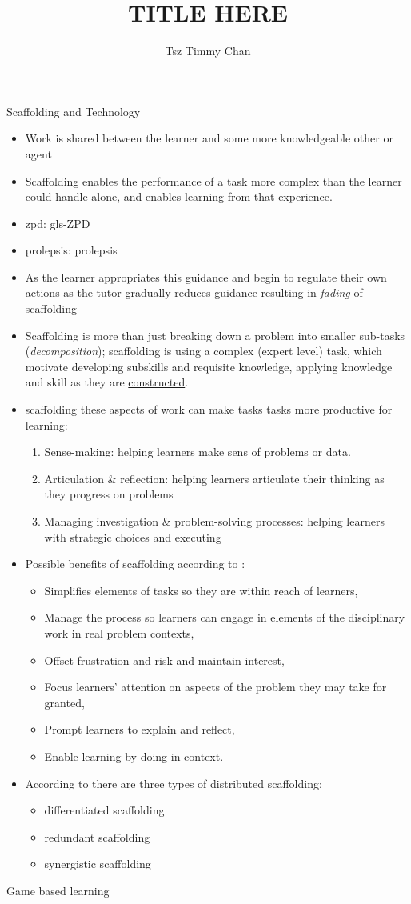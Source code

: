 \documentclass{TC}
\title{TITLE HERE}	%
\author{Tsz Timmy Chan}	%
\begin{document}
Scaffolding \parencite{reiser_scaffolding_2014, tabak_research_2018} and Technology \parencite{scardamalia_knowledge_2014}
\begin{itemize}
\item Work is shared between the learner and some more knowledgeable other or agent
\item Scaffolding enables the performance of a task more complex than the learner could handle alone, and enables learning from that experience.
\item \gls{zpd}: \glsdesc{gls-ZPD}
\item \gls{prolepsis}: \glsdesc{prolepsis}
\item As the learner appropriates this guidance and begin to regulate their own actions as the tutor gradually reduces guidance resulting in \emph{fading} of scaffolding
\item Scaffolding is more than just breaking down a problem into smaller sub-tasks (\textit{decomposition}); scaffolding is using a complex (expert level) task, which motivate developing subskills and requisite knowledge, applying knowledge and skill as they are \underline{constructed}.
\item scaffolding these aspects of work can make tasks tasks more productive for learning:
	\begin{enumerate}
	\item Sense-making: helping learners make sens of problems or data.
	\item Articulation \& reflection: helping learners articulate their thinking as they progress on problems
	\item Managing investigation \& problem-solving processes: helping learners with strategic choices and executing 
	\end{enumerate}
\item Possible benefits of scaffolding according to \parencite{reiser_scaffolding_2014}:
	\begin{itemize}
	\item Simplifies elements of tasks so they are within reach of learners,
	\item Manage the process so learners can engage in elements of the disciplinary work in real problem contexts,
	\item Offset frustration and risk and maintain interest,
	\item Focus learners' attention on aspects of the problem they may take for granted,
	\item Prompt learners to explain and reflect,
	\item Enable learning by doing in context.
	\end{itemize}
\item According to there are three types of \gls{distributed scaffolding}: 
	\begin{itemize}
	\item \Gls{differentiated scaffolding}
	\item \Gls{redundant scaffolding}
	\item \Gls{synergistic scaffolding}
	\end{itemize}
\end{itemize}

Game based learning %
\end{document}
